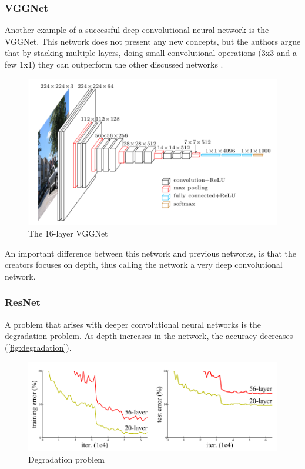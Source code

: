 \subsubsection{VGGNet}
Another example of a successful deep convolutional neural network is the VGGNet. This network does not present any new concepts, but the authors argue that by stacking multiple layers, doing small convolutional operations (3x3 and a few 1x1) they can outperform the other discussed networks \citep{Simonyan2014}.

\begin{figure}[!h]
	\centering
	\includegraphics[scale=0.7]{fig/vgg16.png}
	\caption{The 16-layer VGGNet \citep{Frossard2016}}
	\label{fig:inception}
\end{figure}

An important difference between this network and previous networks, is that the creators focuses on depth, thus calling the network a very deep convolutional network.

\subsubsection{ResNet}
A problem that arises with deeper convolutional neural networks is the degradation problem. As depth increases in the network, the accuracy decreases (\autoref{fig:degradation}).

\begin{figure}[!h]
	\centering
	\includegraphics[scale=0.5]{fig/degradation.png}
	\caption{Degradation problem \citep{Wu2017}}
	\label{fig:degradation}
\end{figure}

